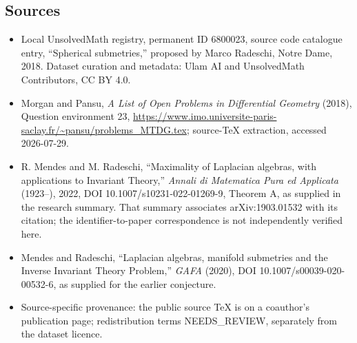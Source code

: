 \documentclass[11pt]{article}
\begin{document}
\subsection{Sources}
\begin{itemize}
\item Local UnsolvedMath registry, permanent ID 6800023, source code catalogue entry, ``Spherical submetries,'' proposed by Marco Radeschi, Notre Dame, 2018. Dataset curation and metadata: Ulam AI and UnsolvedMath Contributors, CC BY 4.0.
\item Morgan and Pansu, \emph{A List of Open Problems in Differential Geometry} (2018), Question environment 23, \url{https://www.imo.universite-paris-saclay.fr/~pansu/problems_MTDG.tex}; source-TeX extraction, accessed 2026-07-29.
\item R. Mendes and M. Radeschi, ``Maximality of Laplacian algebras, with applications to Invariant Theory,'' \emph{Annali di Matematica Pura ed Applicata} (1923--), 2022, DOI 10.1007/s10231-022-01269-9, Theorem A, as supplied in the research summary. That summary associates arXiv:1903.01532 with its citation; the identifier-to-paper correspondence is not independently verified here.
\item Mendes and Radeschi, ``Laplacian algebras, manifold submetries and the Inverse Invariant Theory Problem,'' \emph{GAFA} (2020), DOI 10.1007/s00039-020-00532-6, as supplied for the earlier conjecture.
\item Source-specific provenance: the public source TeX is on a coauthor's publication page; redistribution terms NEEDS\_REVIEW, separately from the dataset licence.
\end{itemize}
\end{document}
